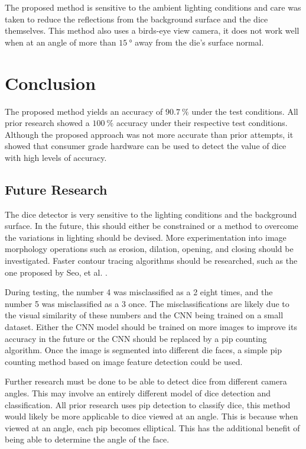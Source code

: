 \documentclass[conference]{IEEEtran}
\begin{document}
The proposed method is sensitive to the ambient lighting conditions and care was taken to reduce the reflections from the background surface and the dice themselves.
This method also uses a birds-eye view camera, it does not work well when at an angle of more than $\SI{15}{\degree}$ away from the die's surface normal.

\section{Conclusion}

The proposed method yields an accuracy of $\SI{90.7}{\percent}$ under the test conditions.
All prior research showed a $\SI{100}{\percent}$ accuracy under their respective test conditions.
Although the proposed approach was not more accurate than prior attempts, it showed that consumer grade hardware can be used to detect the value of dice with high levels of accuracy.

\subsection{Future Research}

The dice detector is very sensitive to the lighting conditions and the background surface.
In the future, this should either be constrained or a method to overcome the variations in lighting should be devised.
More experimentation into image morphology operations such as erosion, dilation, opening, and closing \cite{Szeliski2011} should be investigated.
Faster contour tracing algorithms should be researched, such as the one proposed by Seo, et al. \cite{Seo2016}.

During testing, the number 4 was misclassified as a 2 eight times, and the number 5 was misclassified as a 3 once.
The misclassifications are likely due to the visual similarity of these numbers and the CNN being trained on a small dataset. 
Either the CNN model should be trained on more images to improve its accuracy in the future or the CNN should be replaced by a pip counting algorithm.
Once the image is segmented into different die faces, a simple pip counting method based on image feature detection could be used.

Further research must be done to be able to detect dice from different camera angles.
This may involve an entirely different model of dice detection and classification.
All prior research uses pip detection to classify dice, this method would likely be more applicable to dice viewed at an angle.
This is because when viewed at an angle, each pip becomes elliptical.
This has the additional benefit of being able to determine the angle of the face.

\printbibliography
\end{document}
